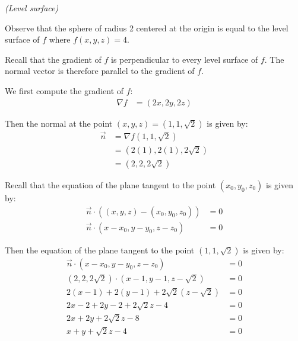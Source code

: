 \begin{solution}
\textit{(Level surface)}
    
    Observe that the sphere of radius 2 centered at the origin is equal to the level surface of \(f\) where \(f(x, y, z) = 4\).
    
    Recall that the gradient of \(f\) is perpendicular to every level surface of \(f\). The normal vector is therefore parallel to the gradient of \(f\).
    
    We first compute the gradient of \(f\):
    \begin{align}
        \nabla f &= (2x, 2y, 2z)
    \end{align}
    
    Then the normal at the point \((x, y, z) = (1, 1, \sqrt{2})\) is given by:
    \begin{align*}
        \vec{n} &= \nabla f(1, 1, \sqrt{2}) \\
        &= (2(1), 2(1), 2\sqrt{2}) \\
        &= (2, 2, 2\sqrt{2})
    \end{align*}
    
    Recall that the equation of the plane tangent to the point \((x_0, y_0, z_0)\) is given by:
    \begin{align}
        \vec{n} \cdot \left((x, y, z) - (x_0, y_0, z_0)\right) &= 0 \\
        \vec{n} \cdot \left(x - x_0, y - y_0, z - z_0\right) &= 0
    \end{align}
    
    Then the equation of the plane tangent to the point \(\left(1, 1, \sqrt{2}\right)\) is given by:
    \begin{align*}
        \vec{n} \cdot \left(x - x_0, y - y_0, z - z_0\right) &= 0 \\
        (2, 2, 2\sqrt{2}) \cdot \left(x - 1, y - 1, z - \sqrt{2}\right) &= 0 \\
        2(x - 1) + 2(y - 1) + 2\sqrt{2}(z - \sqrt{2}) &= 0 \\
        2x - 2 + 2y - 2 + 2\sqrt{2}z - 4 &= 0 \\
        2x + 2y + 2\sqrt{2}z - 8 &= 0 \\
        x + y + \sqrt{2}z - 4 &= 0
    \end{align*}
    
\end{solution}

